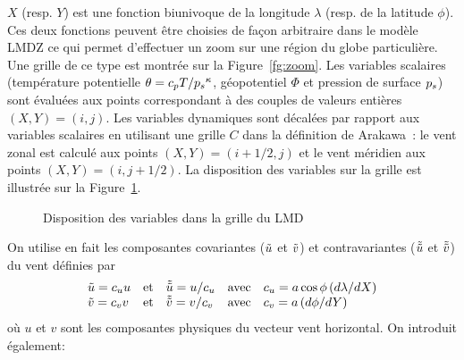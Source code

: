 $X$ (resp. $Y$) est une fonction biunivoque de la longitude $\lambda$
(resp. de la latitude $\phi$). Ces deux fonctions peuvent \^etre choisies
de fa\c{c}on arbitraire dans le mod\`ele LMDZ ce qui permet d'effectuer un
zoom sur une r\'egion du globe particuli\`ere. Une grille de ce type est montr\'ee
sur la Figure~\ref{fg:zoom}.
Les variables scalaires
(temp\'erature potentielle $\theta = c_p T/{p_s}^\kappa$, g\'eopotentiel $\Phi$
et pression de surface $p_s$) sont \'evalu\'ees aux points
correspondant \`a des couples de valeurs enti\`eres $(X,Y)=(i,j)$.
Les variables dynamiques sont d\'ecal\'ees par rapport aux variables
scalaires en utilisant une grille $C$ dans la d\'efinition de
Arakawa~\cite{Arak:77}: le vent zonal est calcul\'e
aux points $(X,Y)=(i+1/2,j)$ et  le vent
m\'eridien aux points $(X,Y)=(i,j+1/2)$.
La disposition des variables sur la grille est illustr\'ee sur la
Figure~\ref{fg:grille}.

\begin{figure}
\centerline{}
\caption{Disposition des variables dans la grille du LMD}
\label{fg:grille}
\end{figure}


On utilise en fait les composantes covariantes
($\tilde{u}$ et $\tilde{v}$) et contravariantes ($\tilde{\tilde{u}}$ et $\tilde{\tilde{v}}$)
du vent d\'efinies par
\begin{equation}
\begin{array}{llllllllll}
\tilde{u} = c_u u & \mbox{et} & \tilde{\tilde{u}} = u / c_u & \mbox{avec} &
c_u = a \cos{\phi} \left( d\lambda/dX \right)  \\
\tilde{v} = c_v v & \mbox{et} & \tilde{\tilde{v}} = v / c_v & \mbox{avec} &
c_v = a \left( d\phi / dY \right)
\end{array}
\end{equation}
%
o\`u $u$ et $v$ sont les composantes physiques du vecteur vent
horizontal.
On introduit \'egalement:
%
